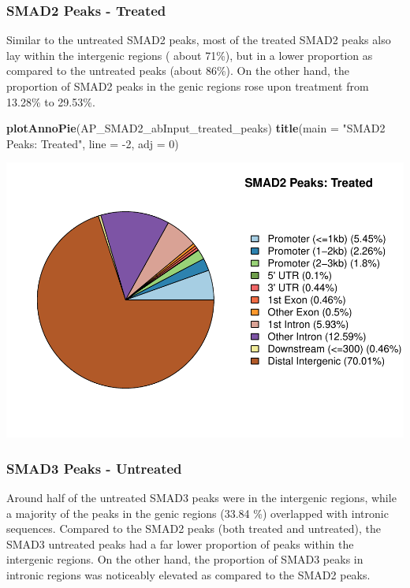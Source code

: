 \documentclass[]{article}
\newenvironment{Shaded}{\begin{snugshade}}{\end{snugshade}}
\newcommand{\DataTypeTok}[1]{\textcolor[rgb]{0.13,0.29,0.53}{#1}}
\newcommand{\DecValTok}[1]{\textcolor[rgb]{0.00,0.00,0.81}{#1}}
\newcommand{\KeywordTok}[1]{\textcolor[rgb]{0.13,0.29,0.53}{\textbf{#1}}}
\newcommand{\NormalTok}[1]{#1}
\newcommand{\StringTok}[1]{\textcolor[rgb]{0.31,0.60,0.02}{#1}}
\begin{document}
\clearpage{}


\subsubsection{SMAD2 Peaks - Treated}

Similar to the untreated SMAD2 peaks, most of the treated SMAD2 peaks
also lay within the intergenic regions ( about 71\%), but in a lower
proportion as compared to the untreated peaks (about 86\%). On the other
hand, the proportion of SMAD2 peaks in the genic regions rose upon
treatment from 13.28\% to 29.53\%.

\begin{Shaded}
\begin{Highlighting}[]
\KeywordTok{plotAnnoPie}\NormalTok{(AP_SMAD2_abInput_treated_peaks)}
\KeywordTok{title}\NormalTok{(}\DataTypeTok{main =} \StringTok{"SMAD2 Peaks: Treated"}\NormalTok{, }\DataTypeTok{line =} \DecValTok{-2}\NormalTok{, }\DataTypeTok{adj =} \DecValTok{0}\NormalTok{)}
\end{Highlighting}
\end{Shaded}

\includegraphics{peak_annotation_go_term_analysis_files/figure-latex/unnamed-chunk-11-1.pdf}

\clearpage{}


\subsubsection{SMAD3 Peaks - Untreated}

Around half of the untreated SMAD3 peaks were in the intergenic regions,
while a majority of the peaks in the genic regions (33.84 \%) overlapped
with intronic sequences. Compared to the SMAD2 peaks (both treated and
untreated), the SMAD3 untreated peaks had a far lower proportion of
peaks within the intergenic regions. On the other hand, the proportion
of SMAD3 peaks in intronic regions was noticeably elevated as compared
to the SMAD2 peaks.
\end{document}
